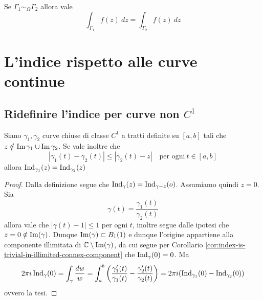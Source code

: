 \begin{corollary}
  Se $\Gamma_1 \sim_\Omega \Gamma_2$ allora vale
  \begin{equation*}
    \int_{\Gamma_1}f(z) \ dz = \int_{\Gamma_2 } f(z)\ dz
  \end{equation*}
  \label{cor:uguaglianza-catene-per-integrali}
\end{corollary}

\section{L'indice rispetto alle curve continue}
\subsection{\textcolor{AnComp}{\textbf{Ridefinire l'indice per curve non $C^1$}}}

\begin{lemma}
    Siano $\gamma_1, \gamma_2$ curve chiuse di classe $C^1$ a tratti definite su
    $\left[ a,b \right]$ tali che $z \notin \operatorname{Im}{\gamma_1} \cup
    \operatorname{Im}{\gamma_2}$. Se vale inoltre che 
    \begin{equation*}
        |\gamma_1(t) - \gamma_2(t)| \le |\gamma_2(t) -z| \quad \text{per
        ogni}\ t \in \left[ a,b \right]
    \end{equation*}
    allora $\operatorname{Ind}_{\gamma_1}(z)
    = \operatorname{Ind}_{\gamma_2}(z)$
    \label{lem:stesso-indice-curve-vicine-in-punto}
\end{lemma}
\begin{proof}
 Dalla definizione segue che $\operatorname{Ind}_\gamma(z)
 = \operatorname{Ind}_{\gamma - z}(o)$. 
 Assumiamo quindi $z = 0$. Sia 
 \begin{equation*}
   \gamma(t) = \frac{\gamma_1(t)}{\gamma_2(t)}
 \end{equation*}
 allora vale che $|\gamma(t) - 1| \le 1$ per ogni $t$, inoltre segue dalle
 ipotesi che $z=0 \notin \operatorname{Im}(\gamma)$. Dunque $\operatorname{Im}(\gamma) \subset
 B_{1}(1)$ e dunque l'origine appartiene alla componente illimitata di $\mathbb{C}
 \setminus \operatorname{Im}(\gamma)$, da cui segue per Corollario
 \ref{cor:index-is-trivial-in-illimited-connex-component} che
 $\operatorname{Ind}_\gamma(0) = 0$. Ma 
 \begin{equation*}
   2\pi i \operatorname{Ind}_\gamma(0) = \int_\gamma \frac{dw}{w} = \int_a^b
   \left( \frac{\gamma'_1(t)}{\gamma_1(t)}
   - \frac{\gamma'_2(t)}{\gamma_2(t)}\right) = 2\pi
   i (\operatorname{Ind}_{\gamma_1}(0) - \operatorname{Ind}_{\gamma_2}(0))
 \end{equation*}
 ovvero la tesi.
\end{proof}

